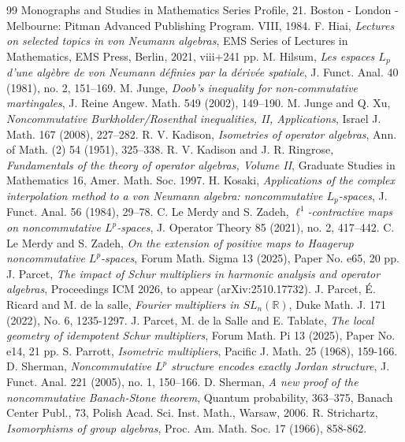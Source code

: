 \documentclass[12pt]{amsart}
\newcommand{\Rdb}{\mbox{$\mathbb{R}$}}
\theoremstyle{remark}
\theoremstyle{definition}
\numberwithin{equation}{section}
\begin{document}
\begin{thebibliography}{99}
Monographs and Studies in Mathematics Series Profile, 21. Boston - London - Melbourne: Pitman Advanced Publishing Program. VIII, 1984.
 F. Hiai,  {\it Lectures on selected topics in von Neumann algebras},
EMS Series of Lectures in Mathematics, EMS Press, Berlin, 2021, viii+241 pp.
 M. Hilsum, {\it Les espaces $L_p$ d'une algèbre de von Neumann définies par la d\'erivée spatiale},
 J. Funct. Anal. 40 (1981), no. 2, 151–169.
 M. Junge, {\it Doob's inequality for non-commutative martingales},
J. Reine Angew. Math. 549 (2002), 149–190.
 M. Junge and Q. Xu, {\it
Noncommutative Burkholder/Rosenthal inequalities, II, Applications}, 
Israel J. Math. 167 (2008), 227–282. 
 R. V.  Kadison, {\it Isometries of operator algebras},
Ann. of Math. (2) 54 (1951), 325–338.
  R. V. Kadison and J. R. Ringrose, 
{\it Fundamentals of the theory of operator algebras, Volume II}, Graduate Studies in Mathematics
16, Amer. Math. Soc. 1997.
 H. Kosaki, 
{\it Applications of the complex interpolation method to a von Neumann algebra: noncommutative $L_p$-spaces}, 
J. Funct. Anal. 56 (1984), 29–78.
 C. Le Merdy and S. Zadeh, {\it $\ell^1$-contractive maps on noncommutative 
$L^p$-spaces}, J. Operator Theory 85 (2021), no. 2, 417–442. 
 C. Le Merdy and S. Zadeh, {\it
On the extension of positive maps to Haagerup noncommutative $L^p$-spaces},
Forum Math. Sigma 13 (2025), Paper No. e65, 20 pp.
 J. Parcet, {\it The impact of Schur multipliers in harmonic analysis and operator algebras}, 
Proceedings ICM 2026, to appear (arXiv:2510.17732).
 J. Parcet,  \'E. Ricard and M. de la salle, 
{\it Fourier multipliers in $SL_n(\Rdb)$}, Duke Math. J. 171 (2022), No. 6, 1235-1297.
 J. Parcet, M. de la Salle and E. Tablate, {\it The local geometry of idempotent Schur multipliers}, 
Forum Math. Pi 13 (2025), Paper No. e14, 21 pp. 
 S. Parrott, {\it Isometric multipliers}, Pacific J. Math. 25 (1968), 159-166.
  D. Sherman, {\it Noncommutative $L^p$  structure encodes exactly Jordan structure}, 
J. Funct. Anal. 221 (2005), no. 1, 150–166.
  D. Sherman, {\it A new proof of the noncommutative Banach-Stone theorem}, 
Quantum probability, 363–375, Banach Center Publ., 73, Polish Acad. Sci. Inst. Math., Warsaw, 2006.
 R. Strichartz, {\it Isomorphisms of group  algebras}, Proc. Am. Math. Soc. 17 (1966), 858-862.

\end{thebibliography}
\end{document}
